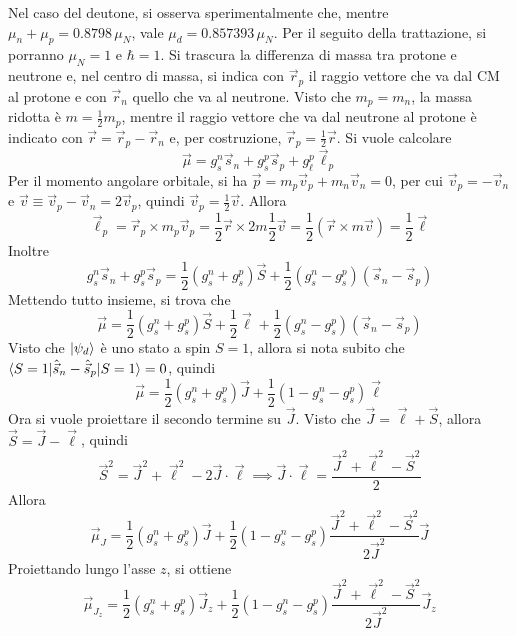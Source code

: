 \documentclass[11pt, a4paper]{scrartcl}
\theoremstyle{style}
\numberwithin{equation}{subsection}
\begin{document}
Nel caso del deutone, si osserva sperimentalmente che, mentre $\mu _n + \mu _p = 0.8798 \, \mu _N$, vale $\mu _d = 0.857393 \, \mu _N$.
Per il seguito della trattazione, si porranno $\mu _N = 1 $ e $\hbar = 1$.
Si trascura la differenza di massa tra protone e neutrone e, nel centro di massa, si indica con $\vec{r}_p$ il raggio vettore che va dal CM al protone e con $\vec{r}_n$ quello che va al neutrone.
Visto che $m_p = m_n$, la massa ridotta \`e $m = \frac{1}{2} m_p$, mentre il raggio vettore che va dal neutrone al protone \`e indicato con $\vec{r} = \vec{r}_p - \vec{r}_n$ e, per costruzione, $\vec{r}_p = \frac{1}{2} \vec{r}$.
Si vuole calcolare 
\[
\vec{\mu } = g_s^n \vec{s}_n + g_s^p \vec{s}_p + g_\ell ^p \vec{\ell }_p
\] 
Per il momento angolare orbitale, si ha $\vec{p} = m_p \vec{v}_p + m_n \vec{v}_n = 0$, per cui $\vec{v}_p = - \vec{v}_n$ e $\vec{v} \equiv \vec{v}_ p - \vec{v}_n = 2 \vec{v}_p$, quindi $\vec{v}_p = \frac{1}{2} \vec{v}$.
Allora
\[
\vec{\ell }_p = \vec{r}_p \times  m_p \vec{v}_p = \frac{1}{2} \vec{r} \times  2 m \frac{1}{2} \vec{v} = \frac{1}{2} (\vec{r}\times m \vec{v}) = \frac{1}{2} \vec{\ell }
\] 
Inoltre
\[
g_s^n \vec{s}_n + g_s^p \vec{s}_p = \frac{1}{2} \left(g_s ^n + g_s ^p\right)  \vec{S} + \frac{1}{2} \left(g_s^n - g_s ^p\right)  \left(\vec{s}_n - \vec{s}_p\right) 
\] 
Mettendo tutto insieme, si trova che
\[
\vec{\mu } = \frac{1}{2} \left(g_s^n + g_s^p\right)  \vec{S} + \frac{1}{2} \vec{\ell } + \frac{1}{2} \left(g_s^n - g_s^p\right)  \left(\vec{s}_ n - \vec{s}_p\right) 
\] 
Visto che $\ket{\psi_d } $ \`e uno stato a spin $S = 1$, allora si nota subito che $\braket{S=1|\hat{\vec{s} }_n- \hat{\vec{s}}_p|S=1} = 0 $, quindi 
\[
\vec{\mu } = \frac{1}{2} \left(g_s^n + g_s ^p\right)  \vec{J} + \frac{1}{2} \left(1 - g_s^n - g_s^p\right)  \vec{\ell }
\] 
Ora si vuole proiettare il secondo termine su $\vec{J}$.
Visto che $\vec{J} = \vec{\ell } + \vec{S}$, allora $\vec{S} = \vec{J}- \vec{\ell }$, quindi
\[
\vec{S}^2 = \vec{J}^2 + \vec{\ell }^2 - 2 \vec{J} \cdot \vec{\ell }\implies \vec{J}\cdot \vec{\ell } = \frac{\vec{J}^2 + \vec{\ell }^2 - \vec{S}^2}{2}
\] 
Allora 
\begin{equation}
	\vec{\mu }_J = \frac{1}{2} \left(g_s^n + g_s^p\right)  \vec{J} + \frac{1}{2}\left(1 - g_s^n - g_s ^p\right) \frac{\vec{J}^2 + \vec{\ell }^2 - \vec{S}^2}{2 \vec{J} ^2} \vec{J}
\end{equation}
Proiettando lungo l'asse $z$, si ottiene 
\begin{equation}
	\vec{\mu }_{J_z} = \frac{1}{2} \left(g_s^n + g_s^p\right)  \vec{J}_z + \frac{1}{2}\left(1 - g_s^n - g_s^p\right)  \frac{\vec{J}^2 + \vec{\ell }^2 - \vec{S}^2}{2  \vec{J}^2 } \vec{J}_z
\end{equation}
\end{document}
